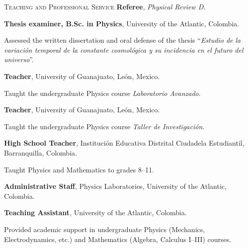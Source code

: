 \begin{rubric}{\faChalkboardTeacher \textsc{Teaching and Professional Service}}
\entry*[2025--present]
\textbf{Referee}, \textit{Physical Review D}.

\entry*[2024] 
\textbf{Thesis examiner, B.Sc. in Physics},  University of the Atlantic, Colombia.  \par
Assessed the written dissertation and oral defense of the thesis “\textit{Estudio de la variación temporal de la constante cosmológica y su incidencia en el futuro del universo}”.

\textbf{Teacher}, University of Guanajuato, León, Mexico.\par 
Taught the undergraduate Physics course \textit{Laboratorio Avanzado}.

\textbf{Teacher}, University of Guanajuato, León, Mexico.\par 
Taught the undergraduate Physics course \textit{Taller de Investigación}.

\entry*[2019--2020] 
\textbf{High School Teacher}, Institución Educativa Distrital Ciudadela Estudiantil, Barranquilla, Colombia.  \par
Taught Physics and Mathematics to grades 8–11.

\entry*[2019--2020] 
\textbf{Administrative Staff}, Physics Laboratories, University of the Atlantic, Colombia.

\entry*[2016--2018] 
\textbf{Teaching Assistant}, University of the Atlantic, Colombia.  \par
Provided academic support in undergraduate Physics (Mechanics, Electrodynamics, etc.) and Mathematics (Algebra, Calculus I–III) courses.




\end{rubric}